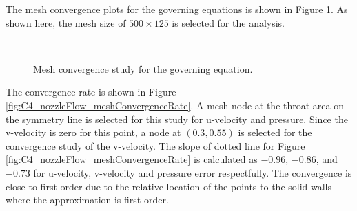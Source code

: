 The mesh convergence plots for the governing equations is shown in Figure \ref{fig:C4_nozzleFlow_meshConvergence}. As shown here, the mesh size of $500 \times 125$ is selected for the analysis.

\begin{figure}[H]
    \centering
    \quad
    \\
    \caption{Mesh convergence study for the governing equation.}
    \label{fig:C4_nozzleFlow_meshConvergence}
\end{figure}

The convergence rate is shown in Figure \ref{fig:C4_nozzleFlow_meshConvergenceRate}. A mesh node at the throat area on the symmetry line is selected for this study for u-velocity and pressure. Since the v-velocity is zero for this point, a node at $(0.3, 0
.55)$ is selected for the convergence study of the v-velocity. The slope of dotted line for Figure \ref{fig:C4_nozzleFlow_meshConvergenceRate} is calculated as $-0.96$, $-0.86$, and $-0.73$ for u-velocity, v-velocity and pressure error respectfully. The convergence is close to first order due to the relative location of the points to the solid walls where the approximation is first order.

